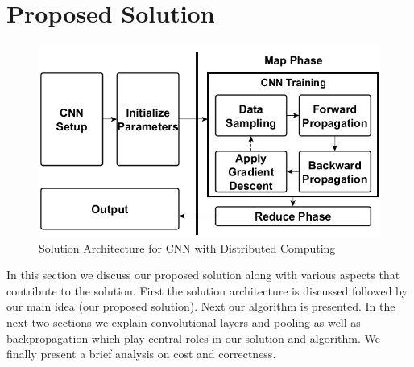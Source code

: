 
\section{Proposed Solution}
\label{Proposed Solution}

\begin {figure}[t]
\centering
\includegraphics[width=0.99\columnwidth]{Paper_Fig2_CNN-DistComputing.png} %
\caption{Solution Architecture for CNN with Distributed Computing}
\label{Solution Architecture for CNN with Distributed Computing}
\end {figure}

In this section we discuss our proposed solution along with various aspects that contribute to the solution. First the solution architecture is discussed followed by our main idea (our proposed solution). Next our algorithm is presented. In the next two sections we explain convolutional layers and pooling as well as backpropagation which play central roles in our solution and algorithm. We finally present a brief analysis on cost and correctness.
 
